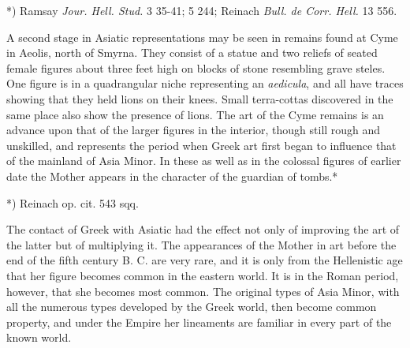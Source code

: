 \documentclass[a4paper, 11pt, oneside, polutonikogreek, english]{article}
\begin{document}
*) Ramsay \emph{Jour. Hell. Stud.} 3 35-41; 5 244; Reinach \emph{Bull. de Corr. Hell.} 13 556.

A second stage in Asiatic representations may be seen in remains found at Cyme in Aeolis, north of Smyrna. They consist of a statue and two reliefs of seated female figures about three feet high on blocks of stone resembling grave steles. One figure is in a quadrangular niche representing an \emph{aedicula}, and all have traces showing that they held lions on their knees. Small terra-cottas discovered in the same place also show the presence of lions. The art of the Cyme remains is an advance upon that of the larger figures in the interior, though still rough and unskilled, and represents the period when Greek art first began to influence that of the mainland of Asia Minor. In these as well as in the colossal figures of earlier date the Mother appears in the character of the guardian of tombs.*

*) Reinach op. cit. 543 sqq.

The contact of Greek with Asiatic had the effect not only of improving the art of the latter but of multiplying it. The appearances of the Mother in art before the end of the fifth century B. C. are very rare, and it is only from the Hellenistic age that her figure becomes common in the eastern world. It is in the Roman period, however, that she becomes most common. The original types of Asia Minor, with all the numerous types developed by the Greek world, then become common property, and under the Empire her lineaments are familiar in every part of the known world.
\end{document}
